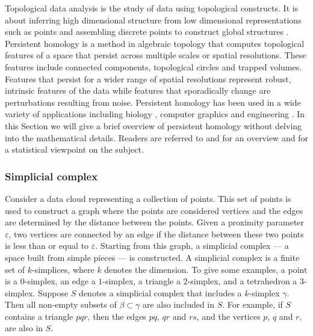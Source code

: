 \documentclass[11pt,a4paper,]{article}
\theoremstyle{definition}
\theoremstyle{definition}
\theoremstyle{definition}
\theoremstyle{remark}
\begin{document}
Topological data analysis is the study of data using topological constructs. It is about inferring high dimensional structure from low dimensional representations such as points and assembling discrete points to construct global structures \autocite{ghrist2008barcodes}. Persistent homology is a method in algebraic topology that computes topological features of a space that persist across multiple scales or spatial resolutions. These features include connected components, topological circles and trapped volumes. Features that persist for a wider range of spatial resolutions represent robust, intrinsic features of the data while features that sporadically change are perturbations resulting from noise. Persistent homology has been used in a wide variety of applications including biology \autocite{topaz2015topological}, computer graphics \autocite{carlsson2008local} and engineering \autocite{perea2015sliding}. In this Section we will give a brief overview of persistent homology without delving into the mathematical details. Readers are referred to \textcite{ghrist2008barcodes} and \textcite{Carlsson2009} for an overview and \textcite{wasserman2018topological} for a statistical viewpoint on the subject.

\hypertarget{simplicial-complex}{%
\subsubsection*{Simplicial complex}\label{simplicial-complex}}

Consider a data cloud representing a collection of points. This set of points is used to construct a graph where the points are considered vertices and the edges are determined by the distance between the points. Given a proximity parameter \(\varepsilon\), two vertices are connected by an edge if the distance between these two points is less than or equal to \(\varepsilon\). Starting from this graph, a simplicial complex --- a space built from simple pieces --- is constructed. A simplicial complex is a finite set of \(k\)-simplices, where \(k\) denotes the dimension. To give some examples, a point is a \(0\)-simplex, an edge a \(1\)-simplex, a triangle a \(2\)-simplex, and a tetrahedron a \(3\)-simplex. Suppose \(S\) denotes a simplicial complex that includes a \(k\)-simplex \(\gamma\). Then all non-empty subsets of \(\beta \subset \gamma\) are also included in \(S\). For example, if \(S\) contains a triangle \(pqr\), then the edges \(pq\), \(qr\) and \(rs\), and the vertices \(p\), \(q\) and \(r\), are also in \(S\).
\end{document}
